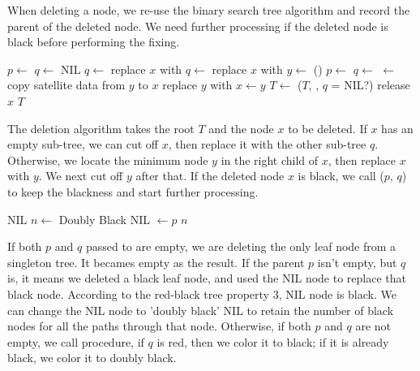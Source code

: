 \documentclass[UTF8]{article}
\begin{document}
When deleting a node, we re-use the binary search tree algorithm and record the parent of the deleted node. We need further processing if the deleted node is black before performing the fixing.

\begin{algorithmic}[1]
  \State $p \gets$ 
  \State $q \gets$ NIL
    \State $q \gets$ 
    \State replace $x$ with 
    \State $q \gets$ 
    \State replace $x$ with 
  \Else
    \State $y \gets$ ()
    \State $p \gets$ 
    \State $q \gets$ 
    \State {} $\gets$ 
    \State copy satellite data from $y$ to $x$
    \State replace $y$ with 
    \State $x \gets y$
  \EndIf
    \State $T \gets$ ($T$, , $q$ = NIL?)
  \EndIf
  \State release $x$
  \State \Return $T$
\EndFunction
\end{algorithmic}

The deletion algorithm takes the root $T$ and the node $x$ to be deleted. If $x$ has an empty sub-tree, we can cut off $x$, then replace it with the other sub-tree $q$. Otherwise, we locate the minimum node $y$ in the right child of $x$, then replace $x$ with $y$. We next cut off $y$ after that. If the deleted node $x$ is black, we call ($p$, $q$) to keep the blackness and start further processing.

\begin{algorithmic}[1]
    \State \Return NIL 
    \State $n \gets$ Doubly Black NIL
    \State {} $\gets p$
    \State \Return $n$
  \Else
    \State \Return {}
  \EndIf
\EndFunction
\end{algorithmic}

If both $p$ and $q$ passed to  are empty, we are deleting the only leaf node from a singleton tree. It becames empty as the result. If the parent $p$ isn't empty, but $q$ is, it means we deleted a black leaf node, and used the NIL node to replace that black node. According to the red-black tree property 3, NIL node is black. We can change the NIL node to 'doubly black' NIL to retain the number of black nodes for all the paths through that node. Otherwise, if both $p$ and $q$ are not empty, we call  procedure, if $q$ is red, then we color it to black; if it is already black, we color it to doubly black.
\end{document}
